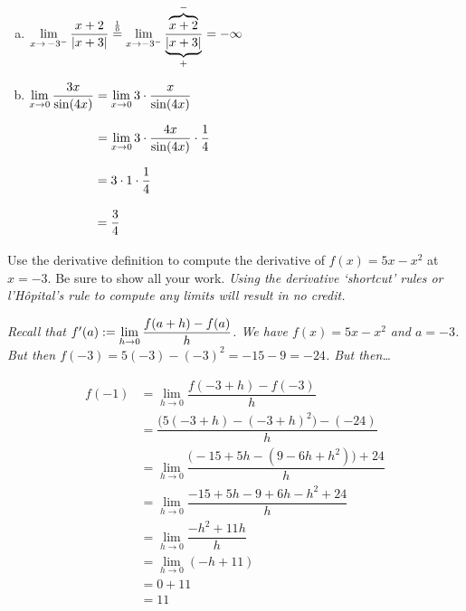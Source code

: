 \documentclass[12pt,letterpaper]{exam}
\begin{document}
\begin{questions}
\begin{enumerate}[(a)]
	\newpage
	
	
	\item $\displaystyle\lim_{x \to \,-3^-} \dfrac{x + 2}{|x + 3|} \stackrel{\frac{1}{0}}{=} \lim_{x \to -3^-} \dfrac{\overbrace{x + 2}^{-}}{\underbrace{|x + 3|}_{+}}= -\infty$ \vspace{9.25cm}
	
	\item $\displaystyle\lim_{x \to 0} \dfrac{3x}{\sin(4x)}= \lim_{x \to 0} 3 \cdot \dfrac{x}{\sin(4x)}$ \par\vspace{0.3cm} 
	$\ds\phantom{\lim_{x \to 0} \dfrac{3x}{\sin(4x)}}= \lim_{x \to 0} 3 \cdot \dfrac{4x}{\sin(4x)} \cdot \dfrac{1}{4}$ \par\vspace{0.3cm}
	$\ds\phantom{\lim_{x \to 0} \dfrac{3x}{\sin(4x)}}= 3 \cdot 1 \cdot \dfrac{1}{4}$ \par\vspace{0.3cm}
	$\ds\phantom{\lim_{x \to 0} \dfrac{3x}{\sin(4x)}}= \dfrac{3}{4}$ \vfill
	\end{enumerate}



\newpage
\question[20] Use the derivative definition to compute the derivative of $f(x)= 5x - x^2$ at $x= -3$. Be sure to show all your work. {\itshape Using the derivative `shortcut' rules or l'H\^opital's rule to compute any limits will result in no credit.} \pspace

{\itshape \tsol Recall that $f'(a):= \displaystyle \lim_{h \to 0} \dfrac{f(a + h) - f(a)}{h}$. We have $f(x)= 5x - x^2$ and $a= -3$. But then $f(-3)= 5(-3) - (-3)^2= -15 - 9= -24$. But then\dots \par\vspace{0.5cm}
	\[
	\begin{aligned}
	f(-1)&= \lim_{h \to 0} \dfrac{f(-3 + h) - f(-3)}{h} \\[0.3cm]
	&= \dfrac{\big( 5(-3 + h) - (-3 + h)^2 \big) - (-24)}{h} \\[0.3cm]
	&= \lim_{h \to 0} \dfrac{\big( -15 + 5h - (9 - 6h + h^2) \big) + 24}{h} \\[0.3cm]
	&= \lim_{h \to 0} \dfrac{-15 + 5h - 9 + 6h - h^2 + 24}{h} \\[0.3cm]
	&= \lim_{h \to 0} \dfrac{-h^2 + 11h}{h} \\[0.3cm]
	&= \lim_{h \to 0} (-h + 11) \\[0.3cm]
	&= 0 + 11 \\[0.3cm]
	&= 11
	\end{aligned}
	\]
}




\end{questions}
\end{document}
